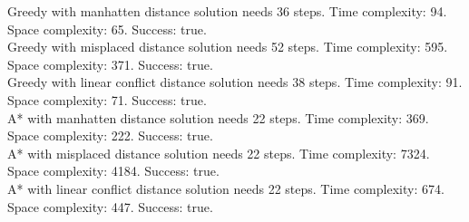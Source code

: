 \documentclass[paper=a4, fontsize=11pt]{scrartcl} %
\numberwithin{equation}{section} %
\numberwithin{figure}{section} %
\numberwithin{table}{section} %
\begin{document}
Greedy with manhatten distance solution needs 36 steps. Time complexity: 94. Space complexity: 65. Success: true.\\ 
Greedy with misplaced distance solution needs 52 steps. Time complexity: 595. Space complexity: 371. Success: true.\\ 
Greedy with linear conflict distance solution needs 38 steps. Time complexity: 91. Space complexity: 71. Success: true.\\ 
A* with manhatten distance solution needs 22 steps. Time complexity: 369. Space complexity: 222. Success: true.\\ 
A* with misplaced distance solution needs 22 steps. Time complexity: 7324. Space complexity: 4184. Success: true.\\ 
A* with linear conflict distance solution needs 22 steps. Time complexity: 674. Space complexity: 447. Success: true.\\ 
\end{document}
